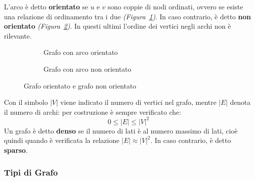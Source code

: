 \documentclass[italian, 10pt]{article}
\begin{document}
L'arco è detto \textbf{orientato} se \(u\) e \(v\) sono coppie di nodi ordinati, ovvero se esiste una relazione di ordinamento tra i due \textit{(Figura~\ref{fig:grafo-arco-orientato})}.
In caso contrario, è detto \textbf{non orientato} \textit{(Figura~\ref{fig:grafo-arco-non-orientato})}.
In questi ultimi l'ordine dei vertici negli archi non è rilevante.

\begin{figure}[htbp]
  \bigskip
  \centering
  \begin{subfigure}[t]{0.495\textwidth}
    \centering
    \caption{Grafo con arco orientato}
    \label{fig:grafo-arco-orientato}
  \end{subfigure}
  \begin{subfigure}[t]{0.495\textwidth}
    \centering
    \caption{Grafo con arco non orientato}
    \label{fig:grafo-arco-non-orientato}
  \end{subfigure}
  \caption{Grafo orientato e grafo non orientato}
  \label{fig:grafo-orientato-non-orientato}
  \bigskip
\end{figure}

Con il simbolo \(|V|\) viene indicato il numero di vertici nel grafo, mentre \(|E|\) denota il numero di archi: per costruzione è sempre verificato che:
\[ 0 \leq |E| \leq |V|^2 \]
Un grafo è detto \textbf{denso} se il numero di lati è  al numero massimo di lati, cioè quindi quando è verificata la relazione \(|E| \approx |V|^2\).
In caso contrario, è detto \textbf{sparso}.

\subsubsection{Tipi di Grafo}
\end{document}
